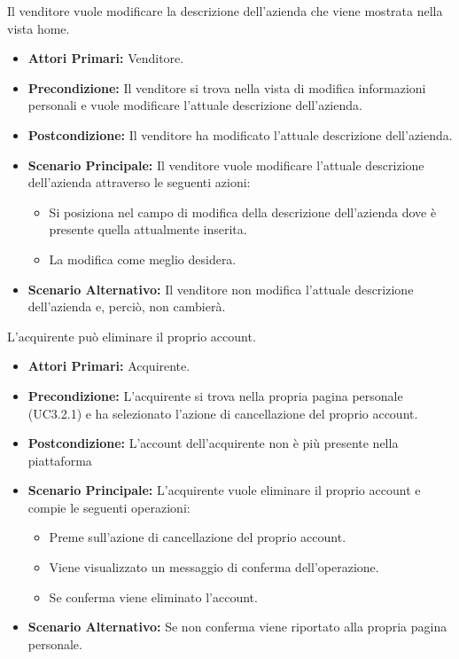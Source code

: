Il venditore vuole modificare la descrizione dell'azienda che viene mostrata nella vista home.
\begin{itemize}
    \item \textbf{Attori Primari:} Venditore.
    \item \textbf{Precondizione:} Il venditore si trova nella vista di modifica informazioni personali e vuole modificare l'attuale descrizione dell'azienda.
    \item \textbf{Postcondizione:} Il venditore ha modificato l'attuale descrizione dell'azienda.
    \item \textbf{Scenario Principale:} Il venditore vuole modificare l'attuale descrizione dell'azienda attraverso le seguenti azioni:
    \begin{itemize}
        \item Si posiziona nel campo di modifica della descrizione dell'azienda dove è presente quella attualmente inserita.
        \item La modifica come meglio desidera.
    \end{itemize}
    \item \textbf{Scenario Alternativo:} Il venditore non modifica l'attuale descrizione dell'azienda e, perciò, non cambierà.
\end{itemize}

L'acquirente può eliminare il proprio account.
\begin{itemize}
    \item \textbf{Attori Primari:} Acquirente.
    \item \textbf{Precondizione:} L'acquirente si trova nella propria pagina personale (UC3.2.1) e ha selezionato l'azione di cancellazione del proprio account.
    \item \textbf{Postcondizione:} L'account dell'acquirente non è più presente nella piattaforma
    \item \textbf{Scenario Principale:} L'acquirente vuole eliminare il proprio account e compie le seguenti operazioni:
    \begin{itemize}
        \item Preme sull'azione di cancellazione del proprio account.
        \item Viene visualizzato un messaggio di conferma dell'operazione.
        \item Se conferma viene eliminato l'account.
    \end{itemize}
    \item \textbf{Scenario Alternativo:} Se non conferma viene riportato alla propria pagina personale.
\end{itemize}

